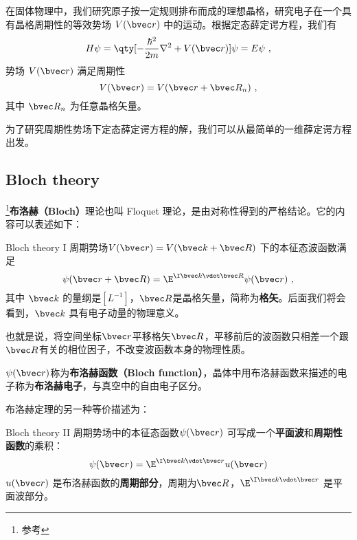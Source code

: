 
\begin{issues}
\issueDraft
\end{issues}


在固体物理中，我们研究原子按一定规则排布而成的理想晶格，研究电子在一个具有晶格周期性的等效势场 $V(\bvec r)$ 中的运动。根据定态薛定谔方程，我们有
\begin{equation}\label{eq_Bloch_4}
H\psi=\qty[-\frac{\hbar^2}{2m}\nabla^2+V(\bvec r)] \psi = E\psi~,
\end{equation}
势场 $V(\bvec r)$ 满足周期性
\begin{equation}
V(\bvec r)=V(\bvec r+\bvec R_n)~,
\end{equation}
其中 $\bvec R_n$ 为任意晶格矢量。

为了研究周期性势场下定态薛定谔方程的解，我们可以从最简单的一维薛定谔方程出发。

\subsection{Bloch theory}
\footnote{参考\cite{GriffQ}}\textbf{布洛赫（Bloch）}理论也叫 Floquet 理论，是由对称性得到的严格结论。它的内容可以表述如下：

\begin{theorem}{Bloch theory I}
周期势场$V(\bvec r) = V(\bvec k + \bvec R)$ 下的本征态波函数满足
\begin{equation}\label{eq_Bloch_1}
\psi(\bvec r + \bvec R) = \E^{\I \bvec k \vdot \bvec R}\psi(\bvec r)~,
\end{equation}
其中 $\bvec k$ 的量纲是$[L^{-1}]$，$\bvec R$是晶格矢量，简称为\textbf{格矢}。后面我们将会看到，$\bvec k$ 具有电子动量的物理意义。 
\end{theorem} 

也就是说，将空间坐标$\bvec r$平移格矢$\bvec R$，平移前后的波函数只相差一个跟$\bvec R$有关的相位因子，不改变波函数本身的物理性质。

$\psi (\bvec r)$称为\textbf{布洛赫函数（Bloch function）}，晶体中用布洛赫函数来描述的电子称为\textbf{布洛赫电子}，与真空中的自由电子区分。

布洛赫定理的另一种等价描述为：

\begin{theorem}{Bloch theory II}
周期势场中的本征态函数$\psi(\bvec r)$ 可写成一个\textbf{平面波}和\textbf{周期性函数}的乘积：
\begin{equation}\label{eq_Bloch_2}
\psi(\bvec r) = \E^{\I \bvec k \vdot \bvec r} u(\bvec r)
\end{equation}
$u( \bvec r)$ 是布洛赫函数的\textbf{周期部分}，周期为$\bvec R$，$\E^{\I \bvec k \vdot \bvec r}$ 是平面波部分。
\end{theorem}

